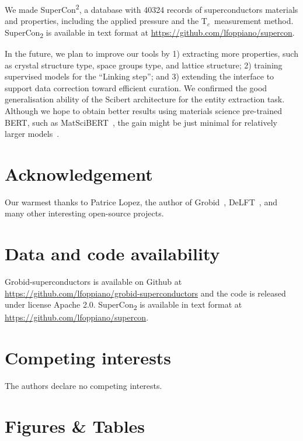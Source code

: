 \documentclass[]{interact}
\theoremstyle{plain}%
\theoremstyle{definition}
\theoremstyle{remark}
\newcommand{\tc}{T$_{c}$}
\begin{document}
We made SuperCon\textsuperscript{2}, a database with 40324 records of superconductors materials and properties, including the applied pressure and the \tc~measurement method.
SuperCon\textsubscript{2} is available in text format at \url{https://github.com/lfoppiano/supercon}.

In the future, we plan to improve our tools by 1) extracting more properties, such as crystal structure type, space groups type, and lattice structure; 2) training supervised models for the ``Linking step''; and 3) extending the interface to support data correction toward efficient curation.
We confirmed the good generalisation ability of the Scibert architecture for the entity extraction task.
Although we hope to obtain better results using materials science pre-trained BERT, such as MatSciBERT~\cite{gupta_matscibert_2022}, the gain might be just minimal for relatively larger models~\cite{hong2022ScholarBERT}.

\section*{Acknowledgement}
\label{sec:acknowledgement}
Our warmest thanks to Patrice Lopez, the author of Grobid~\cite{GROBID}, DeLFT~\citep{DeLFT}, and many other interesting open-source projects.


\section*{Data and code availability}
Grobid-superconductors is available on Github at \url{https://github.com/lfoppiano/grobid-superconductors} and the code is released under license Apache 2.0. 
SuperCon\textsubscript{2} is available in text format at \url{https://github.com/lfoppiano/supercon}. 


\section*{Competing interests}
The authors declare no competing interests.





\section*{Figures \& Tables}
\end{document}
